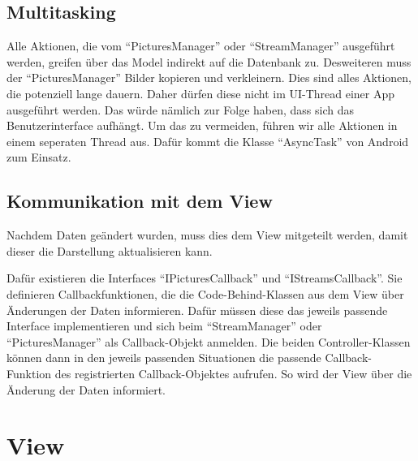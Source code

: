 \subsection{Multitasking}

Alle Aktionen, die vom \enquote{PicturesManager} oder \enquote{StreamManager} ausgeführt werden, greifen über das Model indirekt auf die Datenbank zu. Desweiteren muss der \enquote{PicturesManager} Bilder kopieren und verkleinern. Dies sind alles Aktionen, die potenziell lange dauern. Daher dürfen diese nicht im UI-Thread einer App ausgeführt werden. Das würde nämlich zur Folge haben, dass sich das Benutzerinterface aufhängt. Um das zu vermeiden, führen wir alle Aktionen in einem seperaten Thread aus. Dafür kommt die Klasse \enquote{AsyncTask} von Android zum Einsatz.

\subsection{Kommunikation mit dem View}

Nachdem Daten geändert wurden, muss dies dem View mitgeteilt werden, damit dieser die Darstellung aktualisieren kann.

Dafür existieren die Interfaces \enquote{IPicturesCallback} und \enquote{IStreamsCallback}. Sie definieren Callbackfunktionen, die die Code-Behind-Klassen aus dem View über Änderungen der Daten informieren. Dafür müssen diese das jeweils passende Interface implementieren und sich beim \enquote{StreamManager} oder \enquote{PicturesManager} als Callback-Objekt anmelden. Die beiden Controller-Klassen können dann in den jeweils passenden Situationen die passende Callback-Funktion des registrierten Callback-Objektes aufrufen. So wird der View über die Änderung der Daten informiert.

\section{View}


